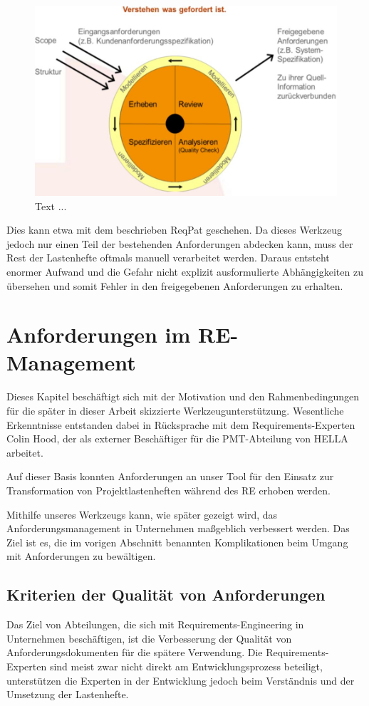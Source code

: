 \documentclass[12pt]{report}
\begin{document}
\begin{figure}[h!]
\begin{center}
\includegraphics[scale=0.6]{Bilder/HOOD-Definition.jpg}
\caption{ Text ...  \cite{hp12}}
\end{center}
\end{figure}

Dies kann etwa mit dem beschrieben ReqPat geschehen. Da dieses Werkzeug jedoch nur einen Teil der bestehenden Anforderungen abdecken kann, muss der Rest der Lastenhefte oftmals manuell verarbeitet werden. Daraus entsteht enormer Aufwand und die Gefahr nicht explizit ausformulierte Abhängigkeiten zu übersehen und somit Fehler in den freigegebenen Anforderungen zu erhalten. 

\section{Anforderungen im RE-Management}
Dieses Kapitel beschäftigt sich mit der Motivation und den Rahmenbedingungen für die später in dieser Arbeit skizzierte Werkzeugunterstützung. Wesentliche Erkenntnisse entstanden dabei in Rücksprache mit dem Requirements-Experten Colin Hood, der als externer Beschäftiger für die PMT-Abteilung von HELLA arbeitet. 

Auf dieser Basis konnten Anforderungen an unser Tool für den Einsatz zur Transformation von Projektlastenheften während des RE erhoben werden. 

Mithilfe unseres Werkzeugs kann, wie später gezeigt wird, das Anforderungsmanagement in Unternehmen maßgeblich verbessert werden. Das Ziel ist es, die im vorigen Abschnitt benannten Komplikationen beim Umgang mit Anforderungen zu bewältigen.

\subsection{Kriterien der Qualität von Anforderungen}
Das Ziel von Abteilungen, die sich mit Requirements-Engineering in Unternehmen beschäftigen, ist die Verbesserung der Qualität von Anforderungsdokumenten für die spätere Verwendung. Die Requirements-Experten sind meist zwar nicht direkt am Entwicklungsprozess beteiligt, unterstützen die Experten in der Entwicklung jedoch beim Verständnis und der Umsetzung der Lastenhefte.
\end{document}
